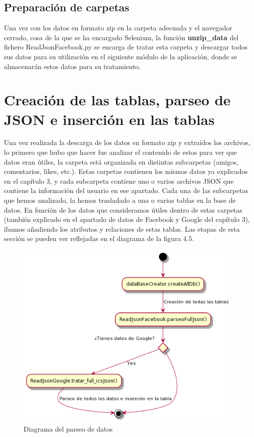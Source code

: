 \subsection{Preparación de carpetas}
Una vez con los datos en formato zip en la carpeta adecuada y el navegador cerrado, cosa de la que se ha encargado Selenium, la función \textbf{unzip\_data} del fichero ReadJsonFacebook.py se encarga de tratar esta carpeta y descargar todos sus datos para su utilización en el siguiente módulo de la aplicación, donde se almacenarán estos datos para su tratamiento. \newpage

\section{Creación de las tablas, parseo de JSON e inserción en las tablas}


Una vez realizada la descarga de los datos en formato zip y extraídos los archivos, lo primero que hubo que hacer fue analizar el contenido de estos para ver que datos eran útiles, la carpeta está organizada en distintas subcarpetas (amigos, comentarios, likes, etc.). Estas carpetas contienen los mismos datos ya explicados en el capítulo 3, y cada subcarpeta contiene uno o varios archivos JSON que contiene la información del usuario en ese apartado. Cada una de las subcarpetas que hemos analizado, la hemos trasladado a una o varias tablas en la base de datos. En función de los datos que consideramos útiles dentro de estas carpetas (también explicado en el apartado de datos de Facebook y Google del capítulo 3), íbamos añadiendo los atributos y relaciones de estas tablas. Las etapas de esta sección se pueden ver reflejadas en el diagrama de la figura 4.5.

\begin{figure}
	\includegraphics[scale=0.8]{Imagenes/Fuentes/Parseo.png}
	\caption{Diagrama del parseo de datos}
	\label{DiagramaParseo}
\end{figure}

